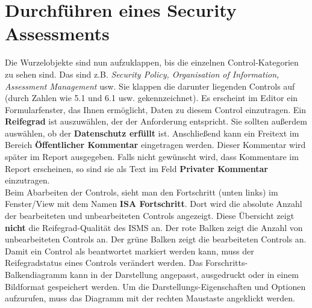 \documentclass[a4paper,10pt]{book}
\begin{document}
\section{Durchführen eines Security Assessments}
Die Wurzelobjekte sind nun aufzuklappen, bis die einzelnen Control-Kategorien zu sehen sind. Das sind z.B. {\em Security Policy,
Organisation of Information, Assessment Management} usw. Sie klappen die darunter liegenden Controls auf (durch Zahlen wie 5.1 und 6.1 usw. gekennzeichnet).
Es erscheint im Editor ein Formularfenster, das Ihnen ermöglicht, Daten zu diesem Control einzutragen. Ein \textbf{Reifegrad} ist auszuwählen,
der der Anforderung entspricht. Sie sollten außerdem auswählen, ob der \textbf{Datenschutz erfüllt} ist. Anschließend kann ein Freitext im Bereich \textbf{Öffentlicher Kommentar} eingetragen werden. Dieser Kommentar wird später im Report ausgegeben. Falls nicht gewünscht wird, dass Kommentare im Report erscheinen,
so sind sie als Text im Feld \textbf{Privater Kommentar} einzutragen.
\newline\\
Beim Abarbeiten der Controls, sieht man den Fortschritt (unten links) im Fenster/View mit dem Namen \textbf{ISA Fortschritt}.
Dort wird die absolute Anzahl der bearbeiteten und unbearbeiteten Controls angezeigt. Diese Übersicht zeigt \textbf{nicht} die Reifegrad-Qualität des ISMS an.
Der rote Balken zeigt die Anzahl von unbearbeiteten Controls an. Der grüne Balken zeigt die bearbeiteten Controls an. Damit ein Control als beantwortet markiert werden kann,
muss der Reifegradstatus eines Controls verändert werden. Das Forschritts-Balkendiagramm kann in der Darstellung angepasst, ausgedruckt oder in einem Bildformat gespeichert werden.
Um die Darstellungs-Eigenschaften und Optionen aufzurufen, muss das Diagramm mit der rechten Maustaste angeklickt werden.
\end{document}
